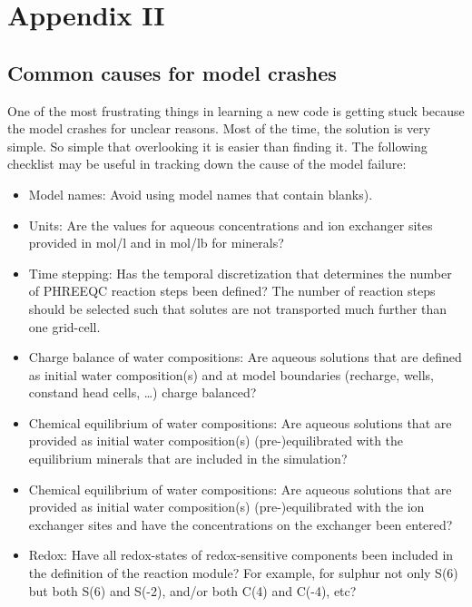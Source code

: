\chapter*{Appendix II}


\def\shorttitle{Appendix II}

\section*{Common causes for model crashes}
One of the most frustrating things in learning a new code is getting stuck because the model crashes for unclear reasons. Most of the time, the solution is very simple. So simple that overlooking it is easier than finding it. The following checklist may be useful in tracking down the cause of the model failure:

\begin{itemize}

\item Model names: Avoid using model names that contain blanks).

\item Units: Are the values for aqueous concentrations and ion exchanger sites provided in mol/l and in mol/lb for minerals?

\item Time stepping: Has the temporal discretization that determines the number of PHREEQC reaction steps been defined? The number of reaction steps should be selected such that solutes are not transported much further than one grid-cell.  

\item Charge balance of water compositions: Are aqueous solutions that are defined as initial water composition(s) and at model boundaries (recharge, wells, constand head cells, \ldots) charge balanced?   

\item Chemical equilibrium of water compositions: Are aqueous solutions that are provided as initial water composition(s) (pre-)equilibrated with the equilibrium minerals that are included in the simulation?   

\item Chemical equilibrium of water compositions: Are aqueous solutions that are provided as initial water composition(s) (pre-)equilibrated with the ion exchanger sites and have the concentrations on the exchanger been entered?    
 
\item Redox: Have all redox-states of redox-sensitive components been included in the definition of the reaction module? For example, for sulphur not only S(6) but both S(6) and S(-2), and/or both C(4) and C(-4), etc? 

\end{itemize}